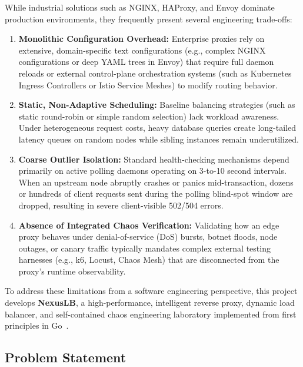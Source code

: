 \documentclass[12pt,openany]{report}
\begin{document}
While industrial solutions such as NGINX, HAProxy, and Envoy dominate production environments, they frequently present several engineering trade-offs:
\begin{enumerate}
  \item \textbf{Monolithic Configuration Overhead:} Enterprise proxies rely on extensive, domain-specific text configurations (e.g., complex NGINX configurations or deep YAML trees in Envoy) that require full daemon reloads or external control-plane orchestration systems (such as Kubernetes Ingress Controllers or Istio Service Meshes) to modify routing behavior.
  \item \textbf{Static, Non-Adaptive Scheduling:} Baseline balancing strategies (such as static round-robin or simple random selection) lack workload awareness. Under heterogeneous request costs, heavy database queries create long-tailed latency queues on random nodes while sibling instances remain underutilized.
  \item \textbf{Coarse Outlier Isolation:} Standard health-checking mechanisms depend primarily on active polling daemons operating on 3-to-10 second intervals. When an upstream node abruptly crashes or panics mid-transaction, dozens or hundreds of client requests sent during the polling blind-spot window are dropped, resulting in severe client-visible 502/504 errors.
  \item \textbf{Absence of Integrated Chaos Verification:} Validating how an edge proxy behaves under denial-of-service (DoS) bursts, botnet floods, node outages, or canary traffic typically mandates complex external testing harnesses (e.g., k6, Locust, Chaos Mesh) that are disconnected from the proxy's runtime observability.
\end{enumerate}

To address these limitations from a software engineering perspective, this project develops \textbf{NexusLB}, a high-performance, intelligent reverse proxy, dynamic load balancer, and self-contained chaos engineering laboratory implemented from first principles in Go~\cite{donovan2015, pike2012}.

\subsection{Problem Statement}
\end{document}
